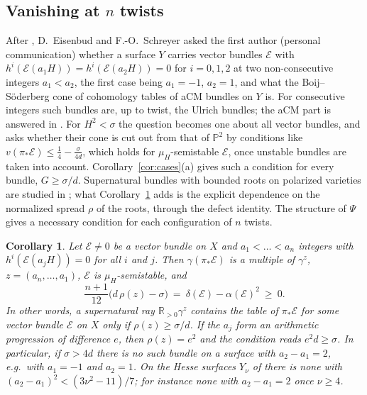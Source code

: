 \documentclass[11pt]{amsart}
\newtheorem{corollary}[theorem]{Corollary}
\theoremstyle{definition}
\theoremstyle{remark}
\newcommand{\PP}{\mathbb{P}}
\newcommand{\RR}{\mathbb{R}}
\newcommand{\cE}{\mathcal{E}}
\begin{document}
\subsection{Vanishing at \texorpdfstring{$n$}{n} twists}\label{sec:twists}
After \cite{An1}, D.~Eisenbud and F.-O.~Schreyer asked the first author (personal communication) whether a surface $Y$ carries vector bundles $\cE$ with $h^i(\cE(a_1H))=h^i(\cE(a_2H))=0$ for $i=0,1,2$ at two non-consecutive integers $a_1<a_2$, the first case being $a_1=-1$, $a_2=1$, and what the Boij--Söderberg cone of cohomology tables of aCM bundles on $Y$ is. For consecutive integers such bundles are, up to twist, the Ulrich bundles; the aCM part is answered in \cite{An2}. For $H^2<\sigma$ the question becomes one about all vector bundles, and \cite[\S12, Question~4]{An3} asks whether their cone is cut out from that of $\PP^2$ by conditions like $v(\pi_*\cE)\le\frac14-\frac\sigma{4d}$, which holds for $\mu_H$-semistable $\cE$, once unstable bundles are taken into account. Corollary~\ref{cor:cases}(a) gives such a condition for every bundle, $G\ge\sigma/d$. Supernatural bundles with bounded roots on polarized varieties are studied in \cite{GL26}; what Corollary~\ref{cor:ES} adds is the explicit dependence on the normalized spread $\rho$ of the roots, through the defect identity. The structure of $\Psi$ gives a necessary condition for each configuration of $n$ twists.

\begin{corollary}\label{cor:ES}
Let $\cE\ne0$ be a vector bundle on $X$ and $a_1<\dots<a_n$ integers with $h^i(\cE(a_jH))=0$ for all $i$ and $j$. Then $\gamma(\pi_*\cE)$ is a multiple of $\gamma^{z}$, $z=(a_n,\dots,a_1)$, $\cE$ is $\mu_H$-semistable, and
\[
\frac{n+1}{12}\big(d\,\rho(z)-\sigma\big)\ =\ \delta(\cE)-\alpha(\cE)^2\ \ge\ 0 .
\]
In other words, a supernatural ray $\RR_{>0}\gamma^{z}$ contains the table of $\pi_*\cE$ for some vector bundle $\cE$ on $X$ only if $\rho(z)\ge\sigma/d$. If the $a_j$ form an arithmetic progression of difference $e$, then $\rho(z)=e^2$ and the condition reads $e^2d\ge\sigma$. In particular, if $\sigma>4d$ there is no such bundle on a surface with $a_2-a_1=2$, e.g.\ with $a_1=-1$ and $a_2=1$. On the Hesse surfaces $Y_\nu$ of \cite[Cor.~1.4]{An2} there is none with $(a_2-a_1)^2<(3\nu^2-11)/7$; for instance none with $a_2-a_1=2$ once $\nu\ge4$.
\end{corollary}
\end{document}
